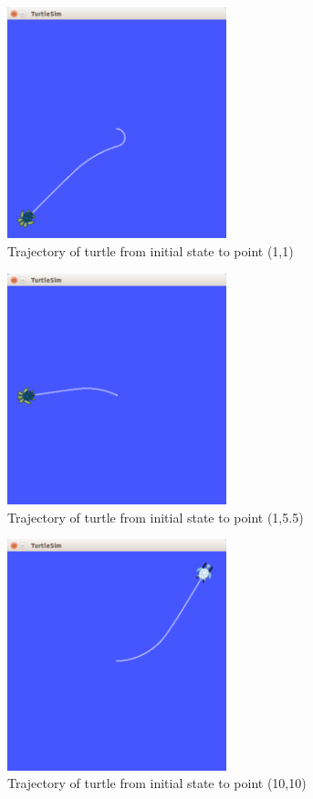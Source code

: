 \documentclass[a4paper, 10pt, conference]{ieeeconf}
\begin{document}
\begin{figure}
   \centering
   \includegraphics[width=2.5in]{figures/1-1.png}
   \caption{Trajectory of turtle from initial state to point (1,1)}
   \label{traj11}
\end{figure}
   
\begin{figure}
   \centering
   \includegraphics[width=2.5in]{figures/1-55.png}
   \caption{Trajectory of turtle from initial state to point (1,5.5)}
   \label{traj155}
\end{figure}
   
\begin{figure}
   \centering
   \includegraphics[width=2.5in]{figures/10-10.png}
   \caption{Trajectory of turtle from initial state to point (10,10)}
   \label{traj1010}
\end{figure}
\end{document}
